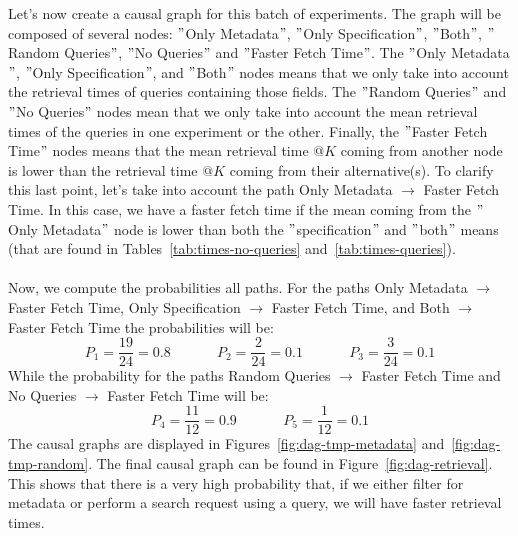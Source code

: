 \noindent Let's now create a causal graph for this batch of experiments.
The graph will be composed of several nodes: \("\)Only Metadata\("\), \("\)Only Specification\("\), \("\)Both\("\), \("\)Random Queries\("\), \("\)No Queries\("\) and \("\)Faster Fetch Time\("\).
The \("\)Only Metadata\("\), \("\)Only Specification\("\), and \("\)Both\("\) nodes means that we only take into account the retrieval times of queries containing those fields.
The \("\)Random Queries\("\) and \("\)No Queries\("\) nodes mean that we only take into account the mean retrieval times of the queries in one experiment or the other.
Finally, the \("\)Faster Fetch Time\("\) nodes means that the mean retrieval time $@K$ coming from another node is lower than the retrieval time $@K$ coming from their alternative(s).
To clarify this last point, let's take into account the path Only Metadata $\rightarrow$ Faster Fetch Time.
In this case, we have a faster fetch time if the mean coming from the \("\)Only Metadata\("\) node is lower than both the \("\)specification\("\) and \("\)both\("\) means (that are found in Tables~\ref{tab:times-no-queries} and~\ref{tab:times-queries}). \\ \\
Now, we compute the probabilities all paths.
For the paths Only Metadata $\rightarrow$ Faster Fetch Time, Only Specification $\rightarrow$ Faster Fetch Time, and Both $\rightarrow$ Faster Fetch Time the probabilities will be:
\[P_1 = \frac{19}{24} = 0.8~~~~~~~~~~~~~~~P_2 = \frac{2}{24} = 0.1~~~~~~~~~~~~~~~P_3 = \frac{3}{24} = 0.1\]
While the probability for the paths Random Queries $\rightarrow$ Faster Fetch Time and No Queries $\rightarrow$ Faster Fetch Time will be:
\[P_4 = \frac{11}{12} = 0.9~~~~~~~~~~~~~~~P_5 = \frac{1}{12} = 0.1\]
The causal graphs are displayed in Figures~\ref{fig:dag-tmp-metadata} and~\ref{fig:dag-tmp-random}.
The final causal graph can be found in Figure~\ref{fig:dag-retrieval}.
This shows that there is a very high probability that, if we either filter for metadata or perform a search request using a query, we will have faster retrieval times.

